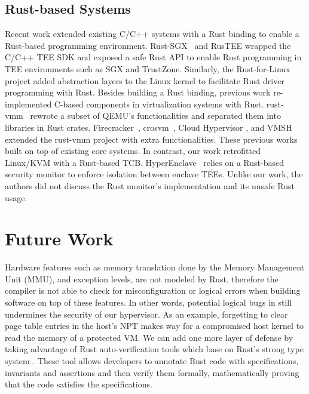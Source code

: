 \subsection{Rust-based Systems}
Recent work extended existing C/C++ systems with a Rust binding to enable
a Rust-based programming environment. Rust-SGX~\cite{rustsgx} and RusTEE
\cite{rustee} wrapped the C/C++ TEE SDK and exposed a safe Rust API
to enable Rust programming in TEE environments such as SGX and TrustZone.
Similarly, the Rust-for-Linux~\cite{Rust-for-Linux} project added
abstraction layers to the Linux kernel to facilitate Rust driver
programming with Rust.
Besides building a Rust binding, previous work re-implemented C-based
components in virtualization systems with Rust.
rust-vmm~\cite{rust-vmm} rewrote a subset of QEMU's functionalities
and separated them into libraries in Rust crates.
Firecracker~\cite{Firecracker}, crosvm~\cite{crosvm}, Cloud Hypervisor
\cite{CloudHypervisor}, and VMSH~\cite{VMSH} extended the
rust-vmm project with extra functionalities. These previous works
built on top of existing core systems. In contrast, our work
retrofitted Linux/KVM with a Rust-based TCB.
HyperEnclave~\cite{hyperenclave} relies on a Rust-based security
monitor to enforce isolation between enclave TEEs. Unlike
our work, the authors did not discuss the Rust monitor's implementation
and its unsafe Rust usage.

\section{Future Work}
\label{sec:fw}

Hardware features such as memory translation done by the Memory Management
Unit (MMU), and exception levels, are not modeled by Rust, therefore the
compiler is not able to check for misconfiguration or logical errors when
building software on top of these features.
In other words, potential logical bugs in \rustcore{} still undermines the
security of our hypervisor.
As an example, forgetting to clear page table entries in the host's NPT
makes way for a compromised host kernel to read the memory of a protected VM.
We can add one more layer of defense by taking advantage of Rust
auto-verification tools which base on Rust's strong type system
\cite{Verus, Prusti, Creusot, Flux}. These tool allows developers to annotate
Rust code with specifications, invariants and assertions and then verify them
formally, mathematically proving that the code satisfies the specifications.

